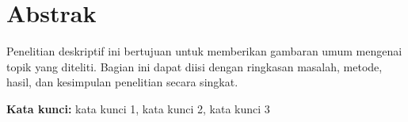 \chapter*{Abstrak}
Penelitian deskriptif ini bertujuan untuk memberikan gambaran umum mengenai topik yang diteliti. Bagian ini dapat diisi dengan ringkasan masalah, metode, hasil, dan kesimpulan penelitian secara singkat.

\vspace{1em}
\textbf{Kata kunci:} kata kunci 1, kata kunci 2, kata kunci 3

\cleardoublepage
